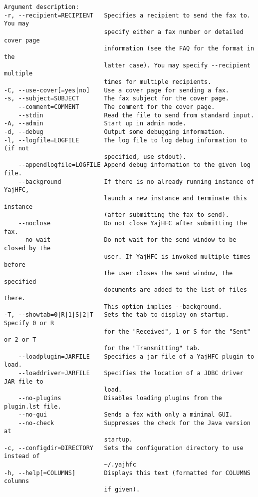 \documentclass[a4paper,10pt]{scrartcl}
\begin{document}
\begin{verbatim}
Argument description:
-r, --recipient=RECIPIENT   Specifies a recipient to send the fax to. You may
                            specify either a fax number or detailed cover page
                            information (see the FAQ for the format in the
                            latter case). You may specify --recipient multiple
                            times for multiple recipients.
-C, --use-cover[=yes|no]    Use a cover page for sending a fax.
-s, --subject=SUBJECT       The fax subject for the cover page.
    --comment=COMMENT       The comment for the cover page.
    --stdin                 Read the file to send from standard input.
-A, --admin                 Start up in admin mode.
-d, --debug                 Output some debugging information.
-l, --logfile=LOGFILE       The log file to log debug information to (if not
                            specified, use stdout).
    --appendlogfile=LOGFILE Append debug information to the given log file.
    --background            If there is no already running instance of YajHFC,
                            launch a new instance and terminate this instance
                            (after submitting the fax to send).
    --noclose               Do not close YajHFC after submitting the fax.
    --no-wait               Do not wait for the send window to be closed by the
                            user. If YajHFC is invoked multiple times before
                            the user closes the send window, the specified
                            documents are added to the list of files there.
                            This option implies --background.
-T, --showtab=0|R|1|S|2|T   Sets the tab to display on startup. Specify 0 or R
                            for the "Received", 1 or S for the "Sent" or 2 or T
                            for the "Transmitting" tab.
    --loadplugin=JARFILE    Specifies a jar file of a YajHFC plugin to load.
    --loaddriver=JARFILE    Specifies the location of a JDBC driver JAR file to
                            load.
    --no-plugins            Disables loading plugins from the plugin.lst file.
    --no-gui                Sends a fax with only a minimal GUI.
    --no-check              Suppresses the check for the Java version at
                            startup.
-c, --configdir=DIRECTORY   Sets the configuration directory to use instead of
                            ~/.yajhfc
-h, --help[=COLUMNS]        Displays this text (formatted for COLUMNS columns
                            if given).
\end{verbatim}
\end{document}
